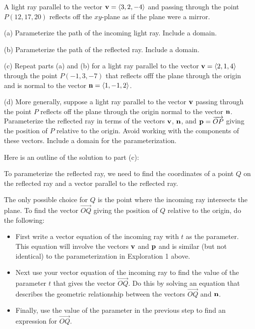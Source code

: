 \documentclass{ximera}
\begin{document}
\begin{question}  \label{Qdr5577:Lines}
A light ray parallel to the vector ${\bf v} = \langle 3,2,-4 \rangle$ and passing through the point $P(12, 17,20)$ reflects off the $xy$-plane as if the plane were a mirror.

(a) Parameterize the path of the incoming light ray. Include a domain.

(b) Parameterize the path of the reflected ray. Include a domain.

(c) Repeat parts (a) and (b) for a light ray parallel to the vector ${\bf v} = \langle 2,1,4 \rangle$ through the point $P(-1,3,-7)$ that reflects offf the plane through the origin and is normal to the vector ${\bf n} = \langle  1, -1, 2 \rangle$.

(d) More generally, suppose a light ray parallel to the vector ${\bf v}$ passing through the point $P$ reflects off the plane through the origin normal to the vector ${\bf n}$. Parameterize the reflected ray in terms of the vectors ${\bf v}$, ${\bf n}$, and ${\bf p} = \overrightarrow{OP}$ giving the position of $P$ relative to the origin. Avoid working with the components of these vectors. Include a domain for the parameterization.

Here is an outline of the solution to part (c):

To parameterize the reflected ray, we need to find the coordinates of a point $Q$ on the reflected ray and a vector parallel to the reflected ray. 

The only possible choice for $Q$ is the point where the incoming ray intersects the plane. To find the vector $\overrightarrow{OQ}$ giving the position of $Q$ relative to the origin, do the following:

\begin{itemize}

\item{First write a vector equation of the incoming ray with $t$ as the parameter. This equation will involve the vectors ${\bf v}$ and ${\bf  p}$ and is similar (but not identical) to the parameterization in Exploration 1 above.} 

\item{Next use your vector equation of the incoming ray to find the value of the parameter $t$ that gives the vector $\overrightarrow{OQ}$. Do this by solving an equation that describes the geometric relationship between the vectors $\overrightarrow{OQ}$ and ${\bf n}$. }

\item{Finally, use the value of the parameter in the previous step to find an expression for $\overrightarrow{OQ}$.}


\end{itemize}
\end{question}
\end{document}
